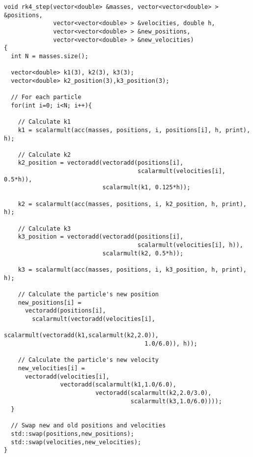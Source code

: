 \documentclass{article}
\begin{document}
\linespread{1}
\begin{lstlisting}[style=CStyle,firstnumber=1]
void rk4_step(vector<double> &masses, vector<vector<double> > &positions,
              vector<vector<double> > &velocities, double h,
              vector<vector<double> > &new_positions,
              vector<vector<double> > &new_velocities)
{
  int N = masses.size();

  vector<double> k1(3), k2(3), k3(3);
  vector<double> k2_position(3),k3_position(3);

  // For each particle
  for(int i=0; i<N; i++){

    // Calculate k1
    k1 = scalarmult(acc(masses, positions, i, positions[i], h, print), h); 

    // Calculate k2
    k2_position = vectoradd(vectoradd(positions[i], 
                                      scalarmult(velocities[i], 0.5*h)),
                            scalarmult(k1, 0.125*h));
    
    k2 = scalarmult(acc(masses, positions, i, k2_position, h, print), h); 

    // Calculate k3
    k3_position = vectoradd(vectoradd(positions[i],
                                      scalarmult(velocities[i], h)),
                            scalarmult(k2, 0.5*h));
    
    k3 = scalarmult(acc(masses, positions, i, k3_position, h, print), h); 

    // Calculate the particle's new position
    new_positions[i] = 
      vectoradd(positions[i],
        scalarmult(vectoradd(velocities[i],
                             scalarmult(vectoradd(k1,scalarmult(k2,2.0)),
                                        1.0/6.0)), h));

    // Calculate the particle's new velocity
    new_velocities[i] = 
      vectoradd(velocities[i],
                vectoradd(scalarmult(k1,1.0/6.0),
                          vectoradd(scalarmult(k2,2.0/3.0),
                                    scalarmult(k3,1.0/6.0))));
  }

  // Swap new and old positions and velocities
  std::swap(positions,new_positions);
  std::swap(velocities,new_velocities);
}
\end{lstlisting}
\linespread{2}
\end{document}

